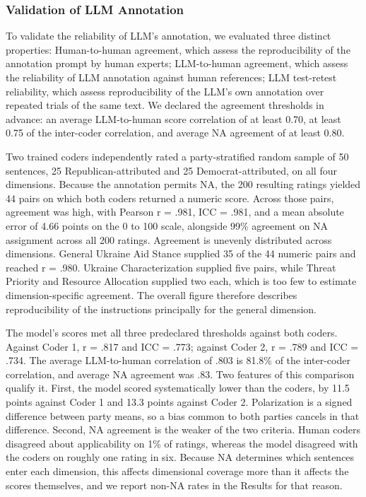 \subsubsection{Validation of LLM Annotation}

To validate the reliability of LLM's annotation, we evaluated three distinct properties: Human-to-human agreement, which assess the reproducibility of the annotation prompt by human experts; LLM-to-human agreement, which assess the reliability of LLM annotation against human references; LLM test-retest reliability, which assess reproducibility of the LLM's own annotation over repeated trials of the same text. We declared the agreement thresholds in advance: an average LLM-to-human score correlation of at least 0.70, at least 0.75 of the inter-coder correlation, and average NA agreement of at least 0.80.

Two trained coders independently rated a party-stratified random sample of 50 sentences, 25 Republican-attributed and 25 Democrat-attributed, on all four dimensions. Because the annotation permits NA, the 200 resulting ratings yielded 44 pairs on which both coders returned a numeric score. Across those pairs, agreement was high, with Pearson r = .981, ICC = .981, and a mean absolute error of 4.66 points on the 0 to 100 scale, alongside 99\% agreement on NA assignment across all 200 ratings. Agreement is unevenly distributed across dimensions. General Ukraine Aid Stance supplied 35 of the 44 numeric pairs and reached r = .980. Ukraine Characterization supplied five pairs, while Threat Priority and Resource Allocation supplied two each, which is too few to estimate dimension-specific agreement. The overall figure therefore describes reproducibility of the instructions principally for the general dimension.

The model's scores met all three predeclared thresholds against both coders. Against Coder 1, r = .817 and ICC = .773; against Coder 2, r = .789 and ICC = .734. The average LLM-to-human correlation of .803 is 81.8\% of the inter-coder correlation, and average NA agreement was .83. Two features of this comparison qualify it. First, the model scored systematically lower than the coders, by 11.5 points against Coder 1 and 13.3 points against Coder 2. Polarization is a signed difference between party means, so a bias common to both parties cancels in that difference. Second, NA agreement is the weaker of the two criteria. Human coders disagreed about applicability on 1\% of ratings, whereas the model disagreed with the coders on roughly one rating in six. Because NA determines which sentences enter each dimension, this affects dimensional coverage more than it affects the scores themselves, and we report non-NA rates in the Results for that reason.

